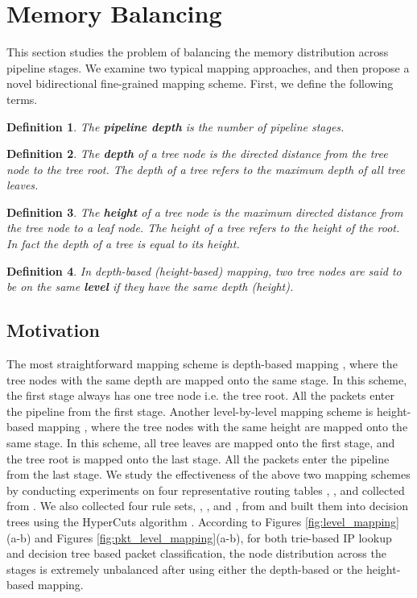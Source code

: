 \documentclass{sigcomm-alternate}
\begin{document}
\section{Memory Balancing}
\label{sec:membalance}

This section studies the problem of balancing the memory distribution across pipeline stages. We examine two typical mapping approaches, and then propose a novel bidirectional fine-grained mapping scheme.
First, we define the following terms.
\newtheorem{theorem}{Definition}

\begin{theorem}
The \textbf{pipeline depth} is the number of pipeline stages.
\end{theorem}
\begin{theorem}
The \textbf{depth} of a tree node is the directed distance from the tree node to the tree root. The depth of a tree refers to the maximum depth of all tree leaves.
\end{theorem}
\begin{theorem}
The \textbf{height} of a tree node is the maximum directed distance from the tree node to a leaf node. The height of a tree refers to the height of the root. In fact the depth of a tree is equal to its height.
\end{theorem}
\begin{theorem}
In depth-based (height-based) mapping, two tree nodes are said to be on the same \textbf{level} if they have the same depth (height).
\end{theorem}

\subsection{Motivation}
\label{sec:motivation}

The most straightforward mapping scheme is depth-based mapping \cite{infocom03:basu}, where the tree nodes with the same depth are mapped onto the same stage. In this scheme, the first stage always has one tree node i.e. the tree root. All the packets enter the pipeline from the first stage.
Another level-by-level mapping scheme is height-based mapping \cite{sigcomm05:hasan}, where the tree nodes with the same height are mapped onto the same stage. In this scheme, all tree leaves are mapped onto the first stage, and the tree root is mapped onto the last stage. All the packets enter the pipeline from the last stage. 
We study the effectiveness of the above two mapping schemes by conducting experiments on four representative routing tables , ,  and  collected from \cite{ripe:ris}. We also collected four rule sets, , ,  and , from \cite{ruleset} and built them into decision trees using the HyperCuts algorithm \cite{sigcomm03:singh}. According to Figures \ref{fig:level_mapping}(a-b) and Figures \ref{fig:pkt_level_mapping}(a-b), for both trie-based IP lookup and decision tree based packet classification, the node distribution across the stages is extremely unbalanced after using either the depth-based or the height-based mapping. 
\end{document}
